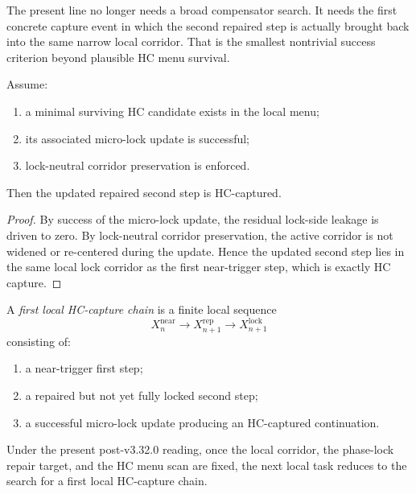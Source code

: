 \begin{remark}
\label{rem:why-capture-is-the-right-next-target}
The present line no longer needs a broad compensator search. It needs the first concrete capture event in which the second repaired step is actually brought back into the same narrow local corridor. That is the smallest nontrivial success criterion beyond plausible HC menu survival.
\end{remark}

\begin{lemma}
\label{lem:minimal-hc-lock-step-yields-local-capture}
Assume:
\begin{enumerate}[leftmargin=2em,label=(\alph*)]
  \item a minimal surviving HC candidate exists in the local menu;
  \item its associated micro-lock update is successful;
  \item lock-neutral corridor preservation is enforced.
\end{enumerate}
Then the updated repaired second step is HC-captured.
\end{lemma}

\begin{proof}
By success of the micro-lock update, the residual lock-side leakage is driven to zero. By lock-neutral corridor preservation, the active corridor is not widened or re-centered during the update. Hence the updated second step lies in the same local lock corridor as the first near-trigger step, which is exactly HC capture.
\end{proof}

\begin{definition}
\label{def:first-local-hc-capture-chain}
A \emph{first local HC-capture chain} is a finite local sequence
\[
  X_n^{\mathrm{near}}
  \to
  X_{n+1}^{\mathrm{rep}}
  \to
  X_{n+1}^{\mathrm{lock}}
\]
consisting of:
\begin{enumerate}[leftmargin=2em,label=(\roman*)]
  \item a near-trigger first step;
  \item a repaired but not yet fully locked second step;
  \item a successful micro-lock update producing an HC-captured continuation.
\end{enumerate}
\end{definition}

\begin{proposition}
\label{prop:current-local-line-reduces-to-hc-capture-chain-search}
Under the present post-v3.32.0 reading, once the local corridor, the phase-lock repair target, and the HC menu scan are fixed, the next local task reduces to the search for a first local HC-capture chain.
\end{proposition}

